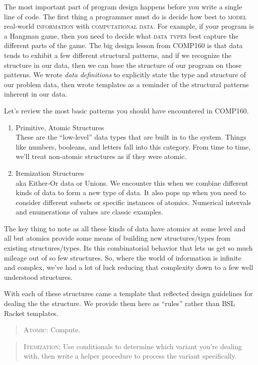 \documentclass[]{tufte-handout}
\begin{document}
The most important part of program design happens before you write a single line of code.  The first thing a programmer must do is decide how best to \textsc{model} real-world \textsc{information} with \textsc{computational data}. For example, if your program is a Hangman game, then you need to decide what \textsc{data types} best capture the different parts of the game. The big design lesson from COMP160 is that data tends to exhibit a few different structural patterns, and if we recognize the structure in our data, then we can base the structure of our program on those patterns. We wrote \textit{data definitions} to explicitly state the type and structure of our problem data, then wrote templates as a reminder of the structural patterns inherent in our data. 

Let's review the most basic patterns you should have encountered in COMP160.
\begin{enumerate}
\item Primitive, Atomic Structures \\
These are the ``low-level'' data types that are built in to the system.  Things like numbers, booleans, and letters fall into this category.  From time to time, we'll treat non-atomic structures as if they were atomic.
\item Itemization Structures \\
aka Either-Or data or Unions.  We encounter this when we combine different kinds of data to form a new type of data. It also pops up when you need to consider different subsets or specific instances of atomics. Numerical intervals and enumerations of values are classic examples.

\end{enumerate}
The key thing to note as all these kinds of data have atomics at some level and all but atomics provide some means of building new structures/types from existing structures/types. Its this combinatorial behavior that lets us get so much mileage out of so few structures. So, where the world of information is infinite and complex, we've had a lot of luck reducing that complexity down to a few well understood structures.

With each of these structures came a template that reflected design guidelines for dealing the the structure. We provide them here as ``rules'' rather than BSL Racket templates. 
\begin{quote}
\textsc{Atomic}: Compute. 
\end{quote}
\begin{quote}
\textsc{Itemization}: Use conditionals to determine which variant you're dealing with, then write a helper procedure to process the variant specifically.
\end{quote}
\end{document}

